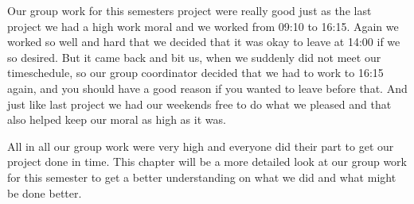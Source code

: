 Our group work for this semesters project were really good just as the last project we had a high work moral and we worked from 09:10 to 16:15. Again we worked so well and hard that we decided that it was okay to leave at 14:00 if we so desired. But it came back and bit us, when we suddenly did not meet our timeschedule, so our group coordinator decided that we had to work to 16:15 again, and you should have a good reason if you wanted to leave before that. 
And just like last project we had our weekends free to do what we pleased and that also helped keep our moral as high as it was.

All in all our group work were very high and everyone did their part to get our project done in time. 
This chapter will be a more detailed look at our group work for this semester to get a better understanding on what we did and what might be done better.